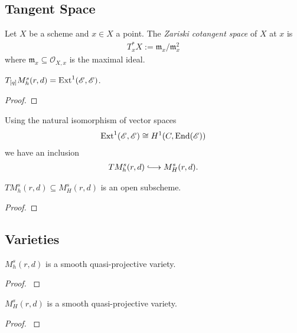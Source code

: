 \documentclass[12pt]{ociamthesis}  %
\begin{document}
\subsection{Tangent Space}

\begin{definition}
  Let $X$ be a scheme and $x\in X$ a point. The \emph{Zariski cotangent
    space} of $X$ at $x$ is
  \begin{align*}
    T_x^* X := \mathfrak m_x /\mathfrak m_x^2
  \end{align*}
  where $\mathfrak m_x\subseteq\mathscr O_{X,x}$ is the maximal ideal.
\end{definition}

\begin{theorem}
  $T_{[q]} M^s_h(r,d) = \operatorname{Ext}^1(\mathscr E,\mathscr E)$.
  \begin{proof}
    \missingproof
  \end{proof}
\end{theorem}

Using the natural isomorphism of vector spaces
\begin{align*}
  \operatorname{Ext}^1(\mathscr E,\mathscr E) \cong H^1(C,\operatorname{End}(\mathscr E))
\end{align*}
we have an inclusion
\begin{align*}
  TM^s_h(r,d) \longinc M^s_H(r,d).
\end{align*}

\begin{corollary}\label{thm:cotangent_is_open}
  $TM^s_h(r,d)\subseteq M^s_H(r,d)$ is an open subscheme.
  \begin{proof}
    \missingproof
  \end{proof}
\end{corollary}

\subsection{Varieties}

\begin{theorem}
  $M^s_h(r,d)$ is a smooth quasi-projective variety.
  \begin{proof}
    \cite[Proposition 8.65]{hoskins2016}
    \missingproof
  \end{proof}
\end{theorem}

\begin{theorem}
  $M^s_H(r,d)$ is a smooth quasi-projective variety.
  \begin{proof}
    \cite[Proposition 7.4]{nitsure1991}
    \missingproof
  \end{proof}
\end{theorem}
\end{document}
